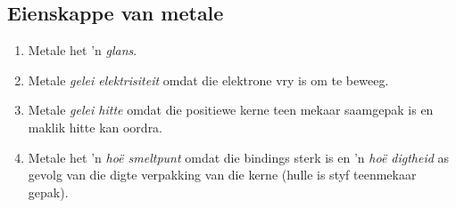 \subsection*{Eienskappe van metale}
\begin{enumerate}[noitemsep, label=\textbf{\arabic*}. ] 
 \item Metale het  'n \textsl{glans}.
\item Metale \textsl{gelei elektrisiteit} omdat die elektrone vry is om te beweeg.
\item Metale \textsl{gelei hitte} omdat die positiewe kerne teen mekaar saamgepak is en maklik hitte kan oordra.
\item Metale het 'n \textsl{ho\"{e} smeltpunt} omdat die bindings sterk is en 'n \textsl{ho\"{e} digtheid} as gevolg van die digte verpakking van die kerne (hulle is styf teenmekaar gepak).
\end{enumerate}

